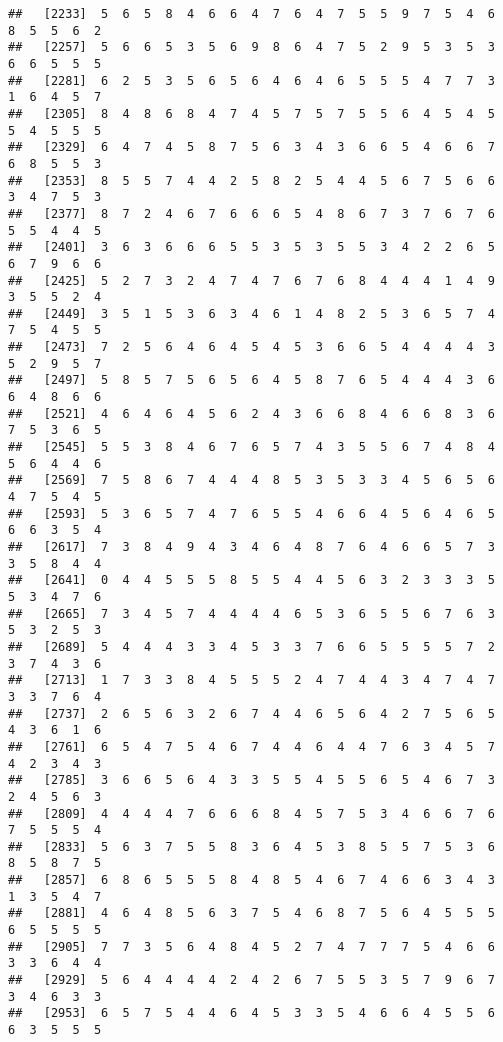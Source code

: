 \documentclass[
]{book}
\begin{document}
\begin{verbatim}
##   [2233]  5  6  5  8  4  6  6  4  7  6  4  7  5  5  9  7  5  4  6  8  5  5  6  2
##   [2257]  5  6  6  5  3  5  6  9  8  6  4  7  5  2  9  5  3  5  3  6  6  5  5  5
##   [2281]  6  2  5  3  5  6  5  6  4  6  4  6  5  5  5  4  7  7  3  1  6  4  5  7
##   [2305]  8  4  8  6  8  4  7  4  5  7  5  7  5  5  6  4  5  4  5  5  4  5  5  5
##   [2329]  6  4  7  4  5  8  7  5  6  3  4  3  6  6  5  4  6  6  7  6  8  5  5  3
##   [2353]  8  5  5  7  4  4  2  5  8  2  5  4  4  5  6  7  5  6  6  3  4  7  5  3
##   [2377]  8  7  2  4  6  7  6  6  6  5  4  8  6  7  3  7  6  7  6  5  5  4  4  5
##   [2401]  3  6  3  6  6  6  5  5  3  5  3  5  5  3  4  2  2  6  5  6  7  9  6  6
##   [2425]  5  2  7  3  2  4  7  4  7  6  7  6  8  4  4  4  1  4  9  3  5  5  2  4
##   [2449]  3  5  1  5  3  6  3  4  6  1  4  8  2  5  3  6  5  7  4  7  5  4  5  5
##   [2473]  7  2  5  6  4  6  4  5  4  5  3  6  6  5  4  4  4  4  3  5  2  9  5  7
##   [2497]  5  8  5  7  5  6  5  6  4  5  8  7  6  5  4  4  4  3  6  6  4  8  6  6
##   [2521]  4  6  4  6  4  5  6  2  4  3  6  6  8  4  6  6  8  3  6  7  5  3  6  5
##   [2545]  5  5  3  8  4  6  7  6  5  7  4  3  5  5  6  7  4  8  4  5  6  4  4  6
##   [2569]  7  5  8  6  7  4  4  4  8  5  3  5  3  3  4  5  6  5  6  4  7  5  4  5
##   [2593]  5  3  6  5  7  4  7  6  5  5  4  6  6  4  5  6  4  6  5  6  6  3  5  4
##   [2617]  7  3  8  4  9  4  3  4  6  4  8  7  6  4  6  6  5  7  3  3  5  8  4  4
##   [2641]  0  4  4  5  5  5  8  5  5  4  4  5  6  3  2  3  3  3  5  5  3  4  7  6
##   [2665]  7  3  4  5  7  4  4  4  4  6  5  3  6  5  5  6  7  6  3  5  3  2  5  3
##   [2689]  5  4  4  4  3  3  4  5  3  3  7  6  6  5  5  5  5  7  2  3  7  4  3  6
##   [2713]  1  7  3  3  8  4  5  5  5  2  4  7  4  4  3  4  7  4  7  3  3  7  6  4
##   [2737]  2  6  5  6  3  2  6  7  4  4  6  5  6  4  2  7  5  6  5  4  3  6  1  6
##   [2761]  6  5  4  7  5  4  6  7  4  4  6  4  4  7  6  3  4  5  7  4  2  3  4  3
##   [2785]  3  6  6  5  6  4  3  3  5  5  4  5  5  6  5  4  6  7  3  2  4  5  6  3
##   [2809]  4  4  4  4  7  6  6  6  8  4  5  7  5  3  4  6  6  7  6  7  5  5  5  4
##   [2833]  5  6  3  7  5  5  8  3  6  4  5  3  8  5  5  7  5  3  6  8  5  8  7  5
##   [2857]  6  8  6  5  5  5  8  4  8  5  4  6  7  4  6  6  3  4  3  1  3  5  4  7
##   [2881]  4  6  4  8  5  6  3  7  5  4  6  8  7  5  6  4  5  5  5  6  5  5  5  5
##   [2905]  7  7  3  5  6  4  8  4  5  2  7  4  7  7  7  5  4  6  6  3  3  6  4  4
##   [2929]  5  6  4  4  4  4  2  4  2  6  7  5  5  3  5  7  9  6  7  3  4  6  3  3
##   [2953]  6  5  7  5  4  4  6  4  5  3  3  5  4  6  6  4  5  5  6  6  3  5  5  5

\end{verbatim}
\end{document}
